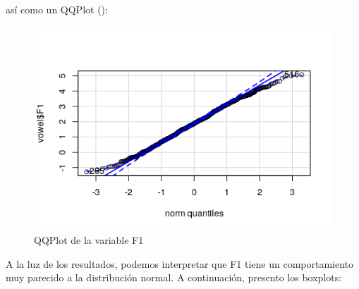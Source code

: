 así como un QQPlot (\cite{10.1093/biomet/55.1.1}):

\begin{figure}[H] %
	\centering
	\includegraphics[scale=0.6]{qq-F1.png}  %
	\caption{QQPlot de la variable F1} 
	\label{fig:qq-F1}
\end{figure}

A la luz de los resultados, podemos interpretar que F1 tiene un comportamiento muy parecido a la distribución normal. A continuación, presento los boxplots:

